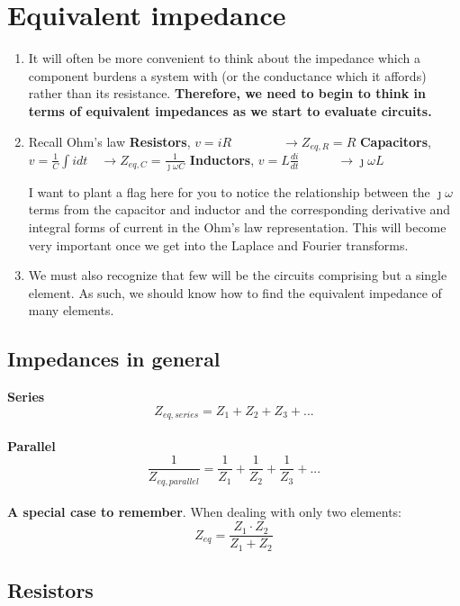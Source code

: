 \documentclass[11pt]{book}
\begin{document}
\section{Equivalent impedance}
\begin{enumerate}
	\item It will often be more convenient to think about the impedance which a component burdens a system with (or the conductance which it affords) rather than its resistance. \textbf{Therefore, we need to begin to think in terms of equivalent impedances as we start to evaluate circuits.}
	\item Recall Ohm's law 
	\subitem \textbf{Resistors}, $v = iR \qquad \qquad \rightarrow Z_{eq,R} = R$
	\subitem \textbf{Capacitors}, $v = \frac{1}{C}\int i dt \quad \rightarrow Z_{eq,C} = \frac{1}{\jmath \omega C}$
	\subitem \textbf{Inductors}, $v = L\frac{di}{dt} \quad \qquad \rightarrow\jmath \omega L$
	
	I want to plant a flag here for you to notice the relationship between the $\jmath \omega$ terms from the capacitor and inductor and the corresponding derivative and integral forms of current in the Ohm's law representation. This will become very important once we get into the Laplace and Fourier transforms.
	\item We must also recognize that few will be the circuits comprising but a single element. As such, we should know how to find the equivalent impedance of many elements.
\end{enumerate}

\subsection{Impedances in general}
\textbf{Series}
\begin{equation}
	\label{zeq,ser}
	Z_{eq,series} = Z_1 + Z_2 + Z_3 + ...
\end{equation}
\\
\textbf{Parallel}
\begin{equation}
	\label{zeq,par}
	\frac{1}{Z_{eq,parallel}} = \frac{1}{Z_1} + \frac{1}{Z_2} + \frac{1}{Z_3} + ...
\end{equation}
\\
\textbf{A special case to remember}. When dealing with only two elements:
\begin{equation}
	\label{zeq,two}
	Z_{eq} = \frac{Z_1\cdot Z_2}{Z_1 + Z_2}
\end{equation}

\subsection{Resistors}
\end{document}
